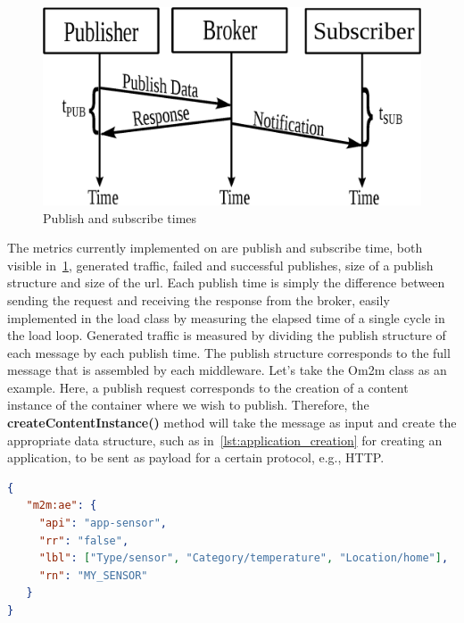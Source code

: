 \documentclass[conference]{IEEEtran}
\begin{document}
\begin{figure}[htbp!]
  \centering
  \includegraphics[width=\linewidth]{figures/pub_sub_time.eps}
  \caption{Publish and subscribe times~\cite{cardoso_benchmarking_2017}}
  \label{fig:pub_sub_time}
\end{figure}

The metrics currently implemented on are publish and subscribe time, both visible in~\ref{fig:pub_sub_time}, generated traffic, failed and successful publishes, size of a publish structure and size of the url. Each publish time is simply the difference between sending the request and receiving the response from the broker, easily implemented in the load class by measuring the elapsed time of a single cycle in the load loop.
Generated traffic is measured by dividing the publish structure of each message by each publish time. The publish structure corresponds to the full message that is assembled by each middleware. Let's take the Om2m class as an example. Here, a publish request corresponds to the creation of a content instance of the container where we wish to publish. Therefore, the \textbf{createContentInstance()} method will take the message as input and create the appropriate data structure, such as in~\ref{lst:application_creation} for creating an application, to be sent as payload for a certain protocol, e.g., HTTP\@.

\begin{lstlisting}[linewidth=\columnwidth, caption=JSON payload for application creation, captionpos=b, label=lst:application_creation, language=json]
{
   "m2m:ae": {
     "api": "app-sensor",
     "rr": "false",
     "lbl": ["Type/sensor", "Category/temperature", "Location/home"],
     "rn": "MY_SENSOR"
   }
}
\end{lstlisting}
\end{document}
